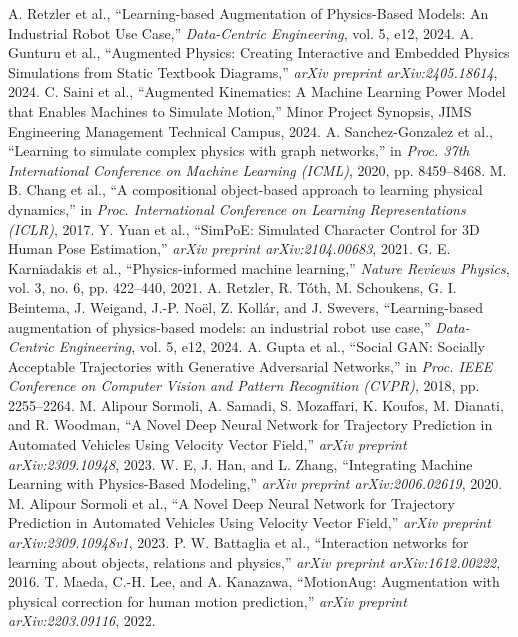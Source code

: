 \documentclass[conference]{IEEEtran}
\begin{document}
\begin{thebibliography}{00}
 A. Retzler et al., ``Learning-based Augmentation of Physics-Based Models: An Industrial Robot Use Case,'' \textit{Data-Centric Engineering}, vol. 5, e12, 2024.
 A. Gunturu et al., ``Augmented Physics: Creating Interactive and Embedded Physics Simulations from Static Textbook Diagrams,'' \textit{arXiv preprint arXiv:2405.18614}, 2024.
 C. Saini et al., ``Augmented Kinematics: A Machine Learning Power Model that Enables Machines to Simulate Motion,'' Minor Project Synopsis, JIMS Engineering Management Technical Campus, 2024.
 A. Sanchez-Gonzalez et al., ``Learning to simulate complex physics with graph networks,'' in \textit{Proc. 37th International Conference on Machine Learning (ICML)}, 2020, pp. 8459--8468.
 M. B. Chang et al., ``A compositional object-based approach to learning physical dynamics,'' in \textit{Proc. International Conference on Learning Representations (ICLR)}, 2017.
 Y. Yuan et al., ``SimPoE: Simulated Character Control for 3D Human Pose Estimation,'' \textit{arXiv preprint arXiv:2104.00683}, 2021.
 G. E. Karniadakis et al., ``Physics-informed machine learning,'' \textit{Nature Reviews Physics}, vol. 3, no. 6, pp. 422--440, 2021.
 A. Retzler, R. Tóth, M. Schoukens, G. I. Beintema, J. Weigand, J.-P. Noël, Z. Kollár, and J. Swevers, ``Learning-based augmentation of physics-based models: an industrial robot use case,'' \textit{Data-Centric Engineering}, vol. 5, e12, 2024.
 A. Gupta et al., ``Social GAN: Socially Acceptable Trajectories with Generative Adversarial Networks,'' in \textit{Proc. IEEE Conference on Computer Vision and Pattern Recognition (CVPR)}, 2018, pp. 2255--2264.
 M. Alipour Sormoli, A. Samadi, S. Mozaffari, K. Koufos, M. Dianati, and R. Woodman, ``A Novel Deep Neural Network for Trajectory Prediction in Automated Vehicles Using Velocity Vector Field,'' \textit{arXiv preprint arXiv:2309.10948}, 2023.
 W. E, J. Han, and L. Zhang, ``Integrating Machine Learning with Physics-Based Modeling,'' \textit{arXiv preprint arXiv:2006.02619}, 2020.
 M. Alipour Sormoli et al., ``A Novel Deep Neural Network for Trajectory Prediction in Automated Vehicles Using Velocity Vector Field,'' \textit{arXiv preprint arXiv:2309.10948v1}, 2023.
 P. W. Battaglia et al., ``Interaction networks for learning about objects, relations and physics,'' \textit{arXiv preprint arXiv:1612.00222}, 2016.
 T. Maeda, C.-H. Lee, and A. Kanazawa, ``MotionAug: Augmentation with physical correction for human motion prediction,'' \textit{arXiv preprint arXiv:2203.09116}, 2022.
\end{thebibliography}
\end{document}

